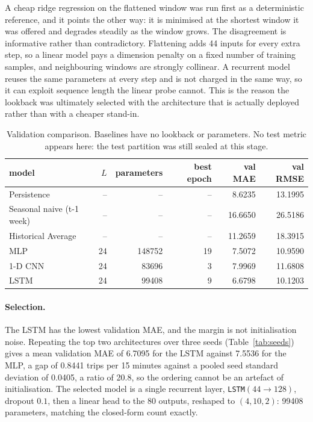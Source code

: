 \documentclass[11pt,a4paper]{article}
\newcommand{\code}[1]{\texttt{#1}}
\begin{document}
A cheap ridge regression on the flattened window was run first as a deterministic
reference, and it points the other way: it is minimised at the shortest window it was
offered and degrades steadily as the window grows. The disagreement is informative
rather than contradictory. Flattening adds
44 inputs for every extra step, so a linear model pays a
dimension penalty on a fixed number of training samples, and neighbouring windows are
strongly collinear. A recurrent model reuses the same parameters at every step and is
not charged in the same way, so it can exploit sequence length the linear probe
cannot. This is the reason the lookback was ultimately selected with the architecture
that is actually deployed rather than with a cheaper stand-in.

\begin{table}[H]
\centering
\caption{Validation comparison. Baselines have no lookback or parameters. No test metric appears here: the test partition was still sealed at this stage.}
\label{tab:p2arch}
\begin{tabular}{lrrrrr}
\toprule
model & $L$ & parameters & best epoch & val MAE & val RMSE \\
\midrule
Persistence & -- & -- & -- & 8.6235 & 13.1995 \\
Seasonal naive (t-1 week) & -- & -- & -- & 16.6650 & 26.5186 \\
Historical Average & -- & -- & -- & 11.2659 & 18.3915 \\
MLP & 24 & 148752 & 19 & 7.5072 & 10.9590 \\
1-D CNN & 24 & 83696 & 3 & 7.9969 & 11.6808 \\
LSTM & 24 & 99408 & 9 & 6.6798 & 10.1203 \\
\bottomrule
\end{tabular}
\end{table}

\paragraph{Selection.} The LSTM has the lowest validation MAE, and the margin is
not initialisation noise. Repeating the top two architectures over three seeds
(Table~\ref{tab:seeds}) gives a mean validation MAE of 6.7095 for the
LSTM against 7.5536 for the MLP, a gap of
0.8441 trips per 15 minutes against a pooled seed standard
deviation of 0.0405, a ratio of
20.8, so the ordering cannot
be an artefact of initialisation. The selected model is a single recurrent
layer, \code{LSTM}$(44\to128)$, dropout $0.1$, then a linear head to the 80
outputs, reshaped to $(4,10,2)$: 99408 parameters,
matching the closed-form count exactly.
\end{document}
